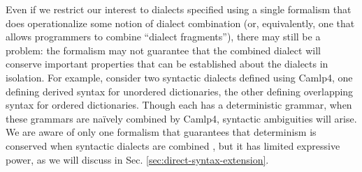 Even if we restrict our interest to dialects specified using a single formalism that does operationalize some notion of dialect combination (or, equivalently, one that allows programmers to combine ``dialect fragments''), there may still be a problem: the formalism may not guarantee that the combined dialect will conserve important properties that can be established about the dialects in isolation. %
For example, consider two syntactic dialects defined using Camlp4, one defining derived syntax for unordered dictionaries, the other defining overlapping syntax for {ordered} dictionaries. Though each has a deterministic grammar, when these grammars are na\"ively  combined by Camlp4, syntactic ambiguities will arise. We are aware of only one formalism that guarantees that determinism is conserved when syntactic dialects are combined \cite{conf/pldi/SchwerdfegerW09}, but it has limited expressive power, as we will discuss in Sec. \ref{sec:direct-syntax-extension}.


